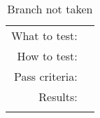\begin{table}[H]
  \begin{tabular}{r | p{8cm}}
    \noalign{\smallskip}\hline\noalign{\smallskip}
    
    What to test:  & \\

    \noalign{\smallskip}\hline\noalign{\smallskip}

    How to test:   &  \\

    \noalign{\smallskip}\hline\noalign{\smallskip}

    Pass criteria: & \\

    \noalign{\smallskip}\hline\noalign{\smallskip}
    
    Results: &   \\
   \noalign{\smallskip}\hline\noalign{\smallskip}
  
  
  
  \end{tabular}
  \caption{Branch not taken}
  \label{testing:fitness:branch_not_taken}
\end{table}
